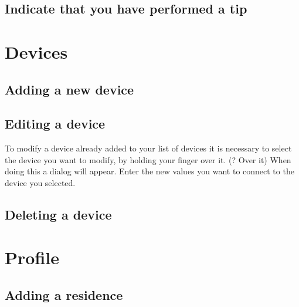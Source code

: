 \subsection{Indicate that you have performed a tip}

\section{Devices}
\subsection{Adding a new device}
\subsection{Editing a device}
To modify a device already added to your list of devices it is necessary to select the device you want to modify, by holding your finger over it. (? Over it) When doing this a dialog will appear. Enter the new values you want to connect to the device you selected. 
\subsection{Deleting a device}

\section{Profile}
\subsection{Adding a residence}
